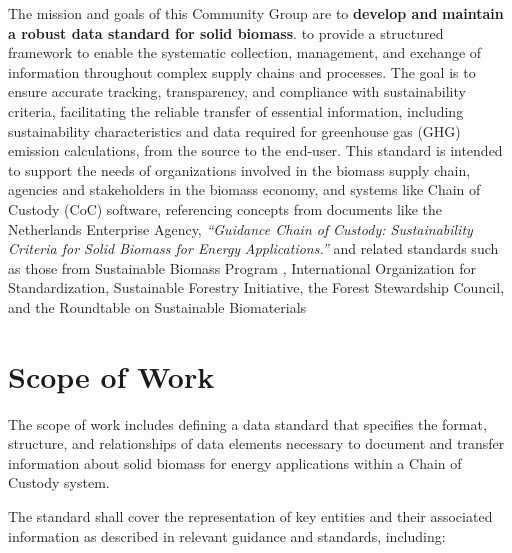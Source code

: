 \documentclass[title=small,preset=opensansnote,par=skip]{article}
\begin{document}
The mission and goals of this Community Group are to \textbf{develop and} \textbf{maintain a robust data standard for solid biomass}. to provide a structured framework to enable the systematic collection, management, and exchange of information throughout complex supply chains and processes. The goal is to ensure accurate tracking, transparency, and compliance with sustainability criteria, facilitating the reliable transfer of essential information, including sustainability characteristics and data required for greenhouse gas (GHG) emission calculations, from the source to the end-user. This standard is intended to support the needs of organizations involved in the biomass supply chain, agencies and stakeholders in the biomass economy, and systems like Chain of Custody (CoC) software, referencing concepts from documents like the Netherlands Enterprise Agency, \emph{“Guidance Chain of} \emph{Custody: Sustainability Criteria for Solid Biomass for Energy} \emph{Applications.”} and related standards such as those from Sustainable Biomass Program , International Organization for Standardization, Sustainable Forestry Initiative, the Forest Stewardship Council, and the Roundtable on Sustainable Biomaterials
\section{Scope of Work}
\label{sec:org3901de6}

The scope of work includes defining a data standard that specifies the format, structure, and relationships of data elements necessary to document and transfer information about solid biomass for energy applications within a Chain of Custody system.

The standard shall cover the representation of key entities and their associated information as described in relevant guidance and standards, including:
\end{document}
